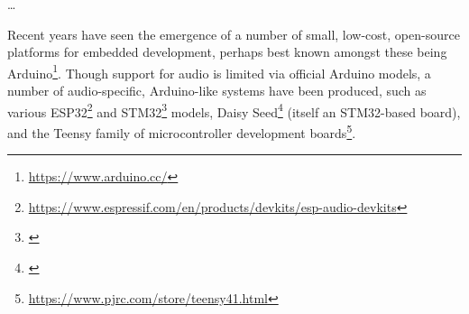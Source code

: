\dots

Recent years have seen the emergence of a number of small, low-cost, open-source
platforms for embedded development, perhaps best known amongst these being
Arduino\footnote{\url{https://www.arduino.cc/}}.
Though support for audio is limited via official Arduino models, a number of
audio-specific, Arduino-like systems have been produced, such as various
ESP32\footnote{\url{https://www.espressif.com/en/products/devkits/esp-audio-devkits}}
and STM32\footnote{\url{}} models, Daisy Seed\footnote{\url{}} (itself an STM32-based board), and the Teensy family of microcontroller
development boards\footnote{\url{https://www.pjrc.com/store/teensy41.html}}.
